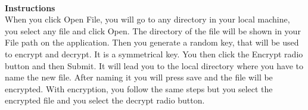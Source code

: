 \textbf{\\Instructions\\}
When you click Open File, you will go to any directory in your local machine, you select any file and click Open. The directory of the file will be shown in your File path on the application. Then you generate a random key, that will be used to encrypt and decrypt. It is a symmetrical key. You then click the Encrypt radio button and then Submit. It will lead you to the local directory where you have to name the new file. After naming it you will press save and the file will be encrypted. With encryption, you follow the same steps but you select the encrypted file and you select the decrypt radio button.
\\